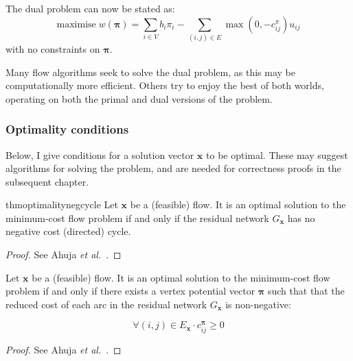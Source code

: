 The dual problem can now be stated as:
\begin{equation}
\mathrm{maximise}\; w(\boldsymbol{\pi})=\sum_{i\in V}b_{i}\pi_{i}-\sum_{(i,j)\in E}\max\left(0,-c_{ij}^{\pi}\right)u_{ij}
\end{equation}
with no constraints on $\boldsymbol{\pi}$.

Many flow algorithms seek to solve the dual problem, as this may be computationally more efficient. Others try to enjoy the best of both worlds, operating on both the primal and dual versions of the problem.

\subsubsection{Optimality conditions} \label{sec:prep-flow-optimality}


Below, I give conditions for a solution vector $\mathbf{x}$ to be optimal. These may suggest algorithms for solving the problem, and are needed for correctness proofs in the subsequent chapter. \\

\begin{restatable}{thm}{optimalitynegcycle}
\label{thm:optimality-neg-cycle}
Let $\mathbf{x}$ be a (feasible) flow. It is an optimal solution to the minimum-cost flow problem if and only if the residual network $G_\mathbf{x}$ has no negative cost (directed) cycle.
\end{restatable}
\begin{proof}
See Ahuja \textit{et al.}~\cite[p.~307]{Ahuja:1993}.
\end{proof}

\begin{thm} \label{thm:optimality-reduced-cost}
Let $\mathbf{x}$ be a (feasible) flow. It is an optimal solution to the minimum-cost flow problem if and only if there exists a vertex potential vector $\boldsymbol{\pi}$ such that that the reduced cost of each arc in the residual network $G_{\mathbf{x}}$ is non-negative:

\begin{equation} \label{eq:optimality-reduced-cost}
\forall(i,j)\in E_{\mathbf{x}}\cdot c_{ij}^{\boldsymbol{\pi}}\geq 0
\end{equation}
\end{thm}
\begin{proof}
See Ahuja \textit{et al.}~\cite[p.~309]{Ahuja:1993}.
\end{proof}

